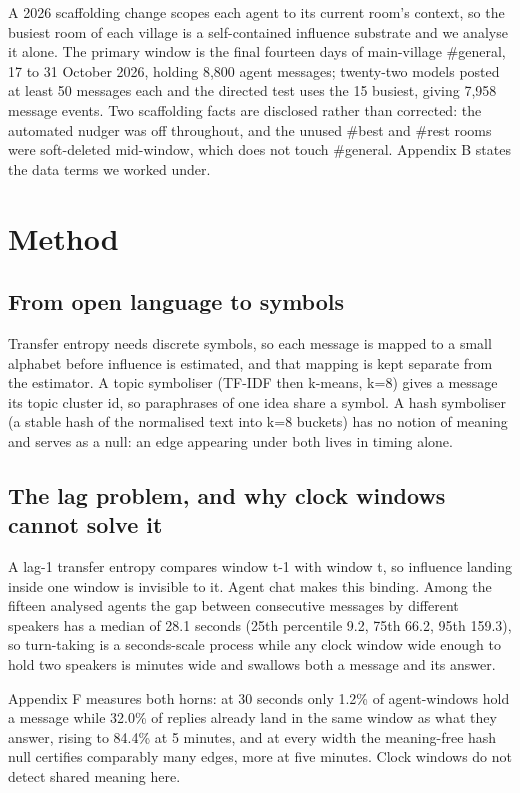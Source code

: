 \documentclass[11pt]{article}
\begin{document}
A 2026 scaffolding change scopes each agent to its current room's context, so the busiest room of each village is a self-contained influence substrate and we analyse it alone. The primary window is the final fourteen days of main-village \#general, 17 to 31 October 2026, holding 8,800 agent messages; twenty-two models posted at least 50 messages each and the directed test uses the 15 busiest, giving 7,958 message events. Two scaffolding facts are disclosed rather than corrected: the automated nudger was off throughout, and the unused \#best and \#rest rooms were soft-deleted mid-window, which does not touch \#general. Appendix B states the data terms we worked under.

\section{Method}

\subsection{From open language to symbols}

Transfer entropy needs discrete symbols, so each message is mapped to a small alphabet before influence is estimated, and that mapping is kept separate from the estimator. A topic symboliser (TF-IDF then k-means, k=8) gives a message its topic cluster id, so paraphrases of one idea share a symbol. A hash symboliser (a stable hash of the normalised text into k=8 buckets) has no notion of meaning and serves as a null: an edge appearing under both lives in timing alone.

\subsection{The lag problem, and why clock windows cannot solve it}

A lag-1 transfer entropy compares window t-1 with window t, so influence landing inside one window is invisible to it. Agent chat makes this binding. Among the fifteen analysed agents the gap between consecutive messages by different speakers has a median of 28.1 seconds (25th percentile 9.2, 75th 66.2, 95th 159.3), so turn-taking is a seconds-scale process while any clock window wide enough to hold two speakers is minutes wide and swallows both a message and its answer.

Appendix F measures both horns: at 30 seconds only 1.2\% of agent-windows hold a message while 32.0\% of replies already land in the same window as what they answer, rising to 84.4\% at 5 minutes, and at every width the meaning-free hash null certifies comparably many edges, more at five minutes. Clock windows do not detect shared meaning here.
\end{document}
